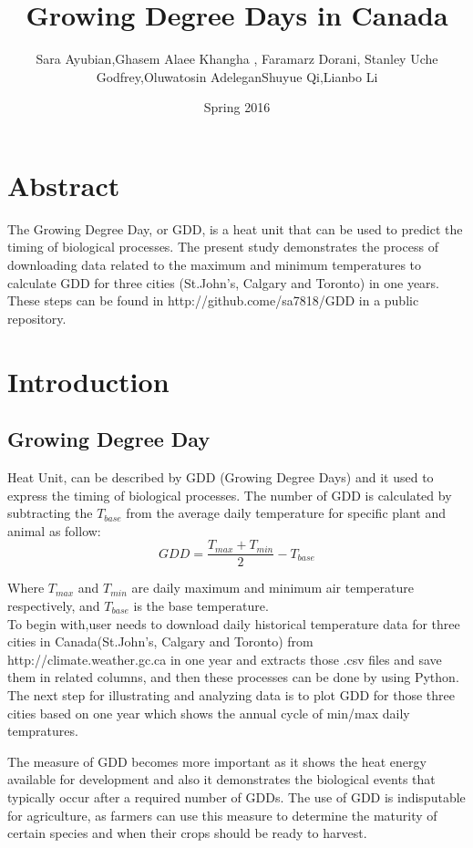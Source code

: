 \documentclass[DIV=calc, paper=a4, fontsize=11pt, twocolumn]{scrartcl}
\title{Growing Degree Days in Canada}
\author{Sara Ayubian\affmark[1]    ,Ghasem Alaee Khangha \affmark[2],    Faramarz Dorani\affmark[3],
Stanley Uche Godfrey\affmark[4],Oluwatosin Adelegan\affmark[5]
Shuyue Qi\affmark[6],Lianbo Li\affmark[7]}
\date{Spring 2016}
\newcommand{\initial}[1]{ 
\lettrine[lines=3,lhang=0.3,nindent=0em]{
\color{DarkGoldenrod}
{\textsf{#1}}}{}}
\begin{document}
\maketitle 
\thispagestyle{fancy} 
\section{Abstract}

\initial{T}he Growing Degree Day, or GDD, is a heat unit that can be used to predict the timing of biological processes. The present study demonstrates the process of downloading data related to the maximum and minimum temperatures to calculate GDD for three cities (St.John's, Calgary and Toronto) in one years. These steps can be found in http://github.come/sa7818/GDD in a public repository.
	
	
	
\section{Introduction}
\subsection{Growing Degree Day}

Heat Unit, can be described by GDD (Growing Degree Days) and it used to express the timing of biological processes. The number of GDD is calculated by subtracting the $T_{base}$ from the average daily temperature for specific plant and animal as follow:
\begin{equation}
GDD =\frac {T_{max}+T_{min}}{2}-T_{base}
\end{equation}

Where $T_{max}$ and $T_{min}$ are daily maximum and minimum air temperature respectively, and $T_{base}$ is the base temperature.\\
To begin with,user needs to download daily historical temperature data for three cities in Canada(St.John's, Calgary and Toronto) from http://climate.weather.gc.ca in one year and extracts those .csv files and save them in related columns, and then these processes can be done by using Python.
The next step for illustrating and analyzing data is to plot GDD for those three cities based on one year which shows the annual cycle of min/max daily tempratures.

The measure of GDD becomes more important as it shows the heat energy available for development and also it demonstrates the biological events that typically occur after a required number of GDDs. The use of GDD is indisputable for agriculture, as farmers can use this measure to determine the maturity of certain species and when their crops should be ready to harvest.
\end{document}
